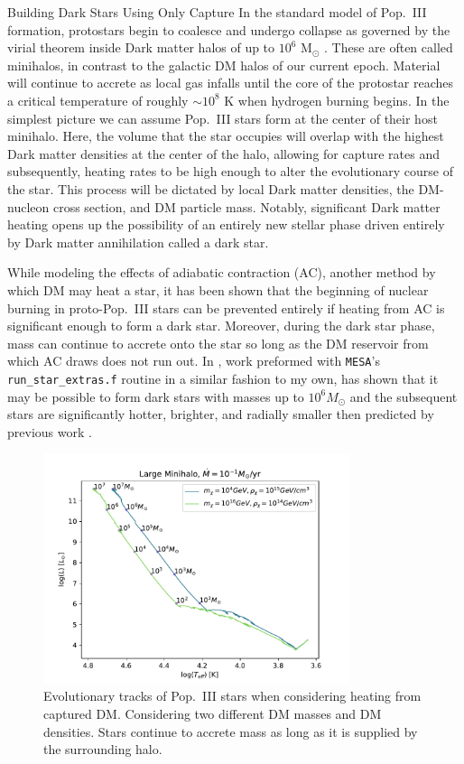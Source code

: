 \documentclass[a4paper,11pt]{article}
\begin{document}
\begin{section}{Building Dark Stars Using Only Capture}
    In the standard model of Pop.~III formation, protostars begin to coalesce and undergo collapse as governed by the virial theorem inside Dark matter halos of up to $10^6$ M$_{\odot}$ \cite{Freese:2016dark}.
    These are often called minihalos, in contrast to the galactic DM halos of our current epoch.
    Material will continue to accrete as local gas infalls until the core of the protostar reaches a critical temperature of roughly $\sim10^8$ K when hydrogen burning begins.
    In the simplest picture we can assume Pop.~III stars form at the center of their host minihalo.
    Here, the volume that the star occupies will overlap with the highest Dark matter densities at the center of the halo, allowing for capture rates and subsequently, heating rates to be high enough to alter the evolutionary course of the star.
    This process will be dictated by local Dark matter densities, the DM-nucleon cross section, and DM particle mass.
    Notably, significant Dark matter heating opens up the possibility of an entirely new stellar phase driven entirely by Dark matter annihilation called a dark star.

    While modeling the effects of adiabatic contraction (AC), another method by which DM may heat a star, it has been shown that the beginning of nuclear burning in proto-Pop.~III stars can be prevented entirely if heating from AC is significant enough to form a dark star.
    Moreover, during the dark star phase, mass can continue to accrete onto the star so long as the DM reservoir from which AC draws does not run out.
    In \cite{Freese:2016dark}, work preformed with \texttt{MESA}'s \texttt{run\_star\_extras.f} routine in a similar fashion to my own, has shown that it may be possible to form dark stars with masses up to $10^6 M_{\odot}$ and the subsequent stars are significantly hotter, brighter, and radially smaller then predicted by previous work \cite{Rindler-Daller:2015} \cite{Rindler-Daller:2020}.
    \begin{figure}
        \centering
        \includegraphics[trim={0 0.2cm 0 0.6cm},clip,width=0.8\textwidth]{hr.pdf}
        \caption{Evolutionary tracks of Pop.~III stars when considering heating from captured DM. Considering two different DM masses and DM densities. Stars continue to accrete mass as long as it is supplied by the surrounding halo.}
    \end{figure}


\end{section}
\end{document}
